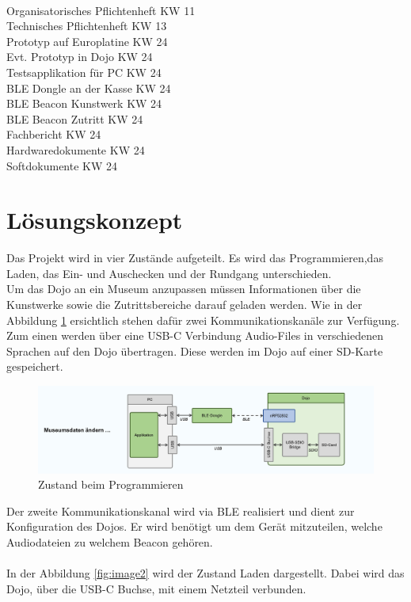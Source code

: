 \documentclass[10pt,a4paper,oneside]{99_fhnwreport}
\begin{document}
\begin{tabbing}
\hspace{80mm}		\= 	\\ %
Organisatorisches Pflichtenheft		\>	KW 11 \\
Technisches Pflichtenheft		\>	KW 13 \\
Prototyp auf Europlatine		\>	KW 24 \\
Evt. Prototyp in Dojo			\>	KW 24 \\
Testsapplikation für PC			\>	KW 24 \\
BLE Dongle  an der Kasse			\>	KW 24 \\
BLE Beacon Kunstwerk			\>	KW 24 \\
BLE Beacon Zutritt			\>	KW 24 \\
Fachbericht				\>	KW 24 \\
Hardwaredokumente			\>	KW 24 \\
Softdokumente				\>	KW 24 \\
\end{tabbing}

\section{Lösungskonzept}\label{sec:konzept}

Das Projekt wird in vier Zustände aufgeteilt. Es wird das Programmieren,das Laden, das Ein- und Auschecken und der Rundgang unterschieden.\\
Um das Dojo an ein Museum anzupassen müssen Informationen über die Kunstwerke sowie die Zutrittsbereiche darauf geladen werden. Wie in der Abbildung \ref{fig:image3} ersichtlich stehen dafür zwei Kommunikationskanäle zur Verfügung. Zum einen werden über eine USB-C Verbindung Audio-Files in verschiedenen Sprachen auf den Dojo übertragen. Diese werden im Dojo auf einer SD-Karte gespeichert.\\

\begin{figure}[htb]
\includegraphics[width=\textwidth]{Zustand_Programmieren.png}
\caption{Zustand beim Programmieren} %
\label{fig:image3}
\end{figure}
\newpage
Der zweite Kommunikationskanal wird via BLE realisiert und dient zur Konfiguration des Dojos. Er wird benötigt um dem Gerät mitzuteilen, welche Audiodateien zu welchem Beacon gehören.\\
\\
In der Abbildung \ref{fig:image2} wird der Zustand Laden dargestellt. Dabei wird das Dojo, über die USB-C Buchse, mit einem Netzteil verbunden.
\end{document}
